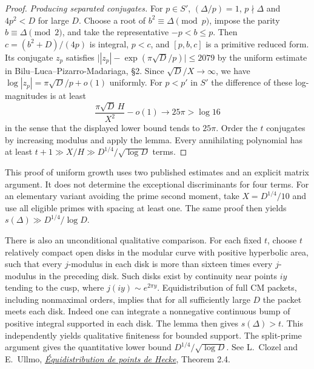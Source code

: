 \begin{proof}
\emph{Producing separated conjugates.}
For $p\in S'$, $(\Delta/p)=1$, $p\nmid\Delta$ and $4p^2<D$ for large
$D$. Choose a root of $b^2\equiv\Delta\pmod p$, impose the parity
$b\equiv\Delta\pmod2$, and take the representative $-p<b\le p$.
Then $c=(b^2+D)/(4p)$ is integral, $p<c$, and $[p,b,c]$ is a primitive
reduced form. Its conjugate $z_p$ satisfies
$\big||z_p|-\exp(\pi\sqrt D/p)\big|\le2079$ by the uniform estimate
in Bilu--Luca--Pizarro-Madariaga, \S2. Since $\sqrt D/X\to\infty$,
we have $\log|z_p|=\pi\sqrt D/p+o(1)$ uniformly. For $p<p'$ in
$S'$ the difference of these log-magnitudes is at least
\[
 \frac{\pi\sqrt D\,H}{X^2}-o(1)\longrightarrow 25\pi>\log16
\]
in the sense that the displayed lower bound tends to $25\pi$.
Order the $t$ conjugates by increasing modulus and apply the lemma. Every
annihilating polynomial has at least $t+1\gg X/H\gg D^{1/4}/\sqrt{\log D}$
terms.
\end{proof}

This proof of uniform growth uses two published estimates and an explicit
matrix argument. It does not determine the exceptional discriminants for
four terms. For an elementary variant avoiding the prime second moment,
take $X=D^{1/4}/10$ and use all eligible primes with spacing at least one.
The same proof then yields $s(\Delta)\gg D^{1/4}/\log D$.

There is also an unconditional qualitative comparison. For each fixed
$t$, choose $t$ relatively compact open disks in the modular curve with
positive hyperbolic area, such that every $j$-modulus in each disk is more
than sixteen times every $j$-modulus in the preceding disk. Such disks
exist by continuity near points $iy$ tending to the cusp, where
$j(iy)\sim e^{2\pi y}$. Equidistribution of full CM packets, including
nonmaximal orders, implies that for all sufficiently large $D$ the packet
meets each disk. Indeed one can integrate a nonnegative continuous bump of
positive integral supported in each disk. The lemma then gives
$s(\Delta)>t$. This independently yields qualitative finiteness for bounded
support. The split-prime argument gives the quantitative lower bound
$D^{1/4}/\sqrt{\log D}$. See L.~Clozel and E.~Ullmo,
\href{https://ullmo.ihes.fr/publications/clozel-ullmo.pdf}{\emph{\'Equidistribution
de points de Hecke}}, Theorem 2.4.

